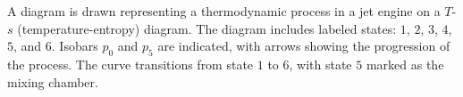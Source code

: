 A diagram is drawn representing a thermodynamic process in a jet engine on a \( T \)-\( s \) (temperature-entropy) diagram. The diagram includes labeled states: \( 1 \), \( 2 \), \( 3 \), \( 4 \), \( 5 \), and \( 6 \). Isobars \( p_0 \) and \( p_5 \) are indicated, with arrows showing the progression of the process. The curve transitions from state \( 1 \) to \( 6 \), with state \( 5 \) marked as the mixing chamber.